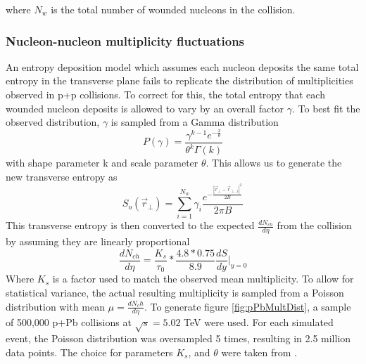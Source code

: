 \documentclass[twocolumn,showpacs,amsfonts,aps,prc,nofootinbib,floatfix]{revtex4}
\begin{document}
where $N_{w}$ is the total number of wounded nucleons in the collision. 

\subsubsection{Nucleon-nucleon multiplicity fluctuations}
\label{sec2a2}

An entropy deposition model which assumes each nucleon deposits the same total entropy in the transverse plane fails to replicate the distribution of multiplicities observed in p+p collisions. To correct for this, the total entropy that each wounded nucleon deposits is allowed to vary by an overall factor $\gamma$. To best fit the observed distribution, $\gamma$ is sampled from a Gamma distribution
\begin{equation} 
	P(\gamma) = \frac{\gamma^{k-1} e^{-\frac{x}{\theta}}}{\theta^k \Gamma(k)}
\end{equation}
with shape parameter k and scale parameter $\theta$. This allows us to generate the new transverse entropy as
\begin{equation} 
	S_{o}(\vec{r}_{\perp}) = \sum\limits_{i=1}^{N_{w}} \gamma_{i} \frac{e^{-\frac{|\vec{r}_{\perp}-\vec{r}_{\perp,i}|^2}{2B}}}{2\pi B}
\end{equation}
This transverse entropy is then converted to the expected $\frac{dN_{ch}}{d\eta}$ from the collision by assuming they are linearly proportional
\begin{equation}
	\frac{dN_{ch}}{d\eta} = \frac{K_{s}}{\tau_0} * \frac{4.8*0.75}{8.9} \frac{dS}{dy}\biggr\rvert_{y=0} 
\end{equation}
Where $K_s$ is a factor used to match the observed mean multiplicity. To allow for statistical variance, the actual resulting multiplicity is sampled from a Poisson distribution with mean $\mu = \frac{dN_ch}{d\eta}$. To generate figure \ref{fig:pPbMultDist}, a sample of 500,000 p+Pb collisions at $\sqrt{s} = 5.02$ TeV were used. For each simulated event, the Poisson distribution was oversampled 5 times, resulting in 2.5 million data points. The choice for parameters $K_s$, and $\theta$ were taken from \cite{Shen:2014vra}.
\end{document}
